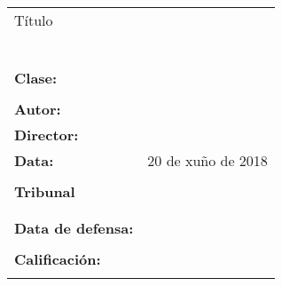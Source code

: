 %
%
\thispagestyle{plain}
\section*{}


\begin{tabular}{p{2cm}p{11cm}}
	\large{Título} & \\
	& \textbf{\large{\titulogalego}} \\
	\\
	& \textbf{\large{\titulo}} \\
	\\
	& \textbf{\large{\tituloenglish}} \\
	\\
	\large{\textbf{Clase:}} & \large{\proyectotipo} \\
	\\
	\large{\textbf{Autor:}} & \large{\autor} \\
	\large{\textbf{Director:}} & \large{\director} \\
	\large{\textbf{Data:}} & \large{20 de xuño de 2018} \\
	\\
	\large{\textbf{Tribunal}} & \\
	& \vspace{3cm} \\
	\\
	\large{\textbf{Data de defensa:}} & \\
	\\
	\large{\textbf{Calificación:}} & \\
	\\
\end{tabular}
